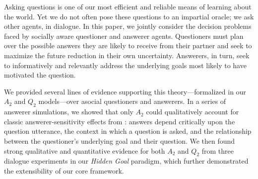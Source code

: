 \documentclass[11pt, floatsintext]{apa6}
\begin{document}

Asking questions is one of our most efficient and reliable means of learning about the world. 
Yet we do not often pose these questions to an impartial oracle; we ask other agents, in dialogue. In this paper, we jointly consider the decision problems faced by socially aware questioner and answerer agents. 
Questioners must plan over the possible answers they are likely to receive from their partner and seek to maximize the future reduction in their own uncertainty. 
Answerers, in turn, seek to informatively and relevantly address the underlying goals most likely to have motivated the question. 

We provided several lines of evidence supporting this theory---formalized in our $A_2$ and $Q_2$ models---over asocial questioners and answerers. 
In a series of answerer simulations, we showed that only $A_2$ could qualitatively account for classic answerer-sensitivity effects from : answers depend critically upon the question utterance, the context in which a question is asked, and the relationship between the questioner's underlying goal and their question. 
We then found strong qualitative and quantitative evidence for both $A_2$ and $Q_2$ from three dialogue experiments in our \emph{Hidden Goal} paradigm, which further demonstrated the extensibility of our core framework. %
\end{document}

